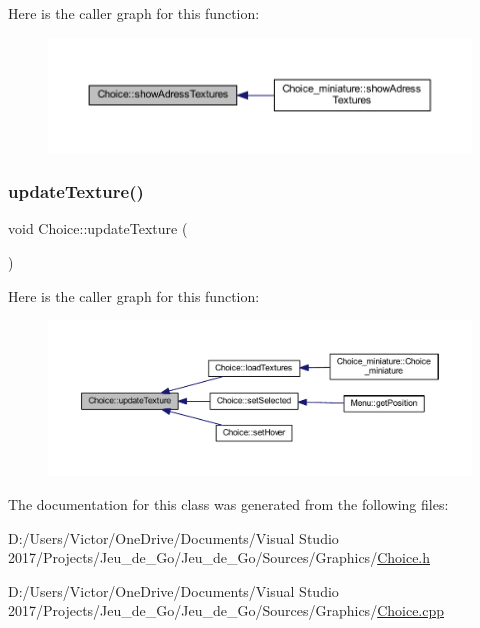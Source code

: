 Here is the caller graph for this function\+:\nopagebreak
\begin{figure}[H]
\begin{center}
\leavevmode
\includegraphics[width=350pt]{class_choice_ad29163ceee43a59dba6ea46452ca46c0_icgraph}
\end{center}
\end{figure}
\mbox{\label{class_choice_aa3113d895017610a03fff73795cf22fd}} 
\subsubsection{\texorpdfstring{update\+Texture()}{updateTexture()}}
{\footnotesize\ttfamily void Choice\+::update\+Texture (\begin{DoxyParamCaption}{ }\end{DoxyParamCaption})}

Here is the caller graph for this function\+:\nopagebreak
\begin{figure}[H]
\begin{center}
\leavevmode
\includegraphics[width=350pt]{class_choice_aa3113d895017610a03fff73795cf22fd_icgraph}
\end{center}
\end{figure}


The documentation for this class was generated from the following files\+:\begin{DoxyCompactItemize}
\item 
D\+:/\+Users/\+Victor/\+One\+Drive/\+Documents/\+Visual Studio 2017/\+Projects/\+Jeu\+\_\+de\+\_\+\+Go/\+Jeu\+\_\+de\+\_\+\+Go/\+Sources/\+Graphics/\hyperlink{_choice_8h}{Choice.\+h}\item 
D\+:/\+Users/\+Victor/\+One\+Drive/\+Documents/\+Visual Studio 2017/\+Projects/\+Jeu\+\_\+de\+\_\+\+Go/\+Jeu\+\_\+de\+\_\+\+Go/\+Sources/\+Graphics/\hyperlink{_choice_8cpp}{Choice.\+cpp}\end{DoxyCompactItemize}
